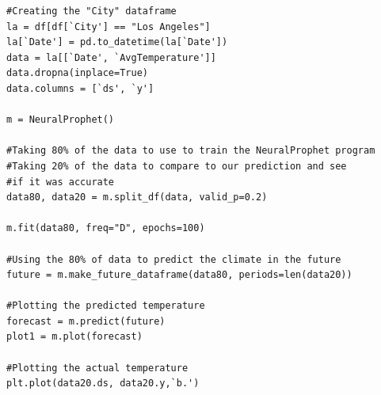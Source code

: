 \documentclass[11pt,a4paper,fleqn]{article}
\begin{document}
\begin{lstlisting}
#Creating the "City" dataframe
la = df[df[`City'] == "Los Angeles"]
la[`Date'] = pd.to_datetime(la[`Date'])
data = la[[`Date', `AvgTemperature']]
data.dropna(inplace=True)
data.columns = [`ds', `y']

m = NeuralProphet()

#Taking 80% of the data to use to train the NeuralProphet program
#Taking 20% of the data to compare to our prediction and see 
#if it was accurate 
data80, data20 = m.split_df(data, valid_p=0.2)

m.fit(data80, freq="D", epochs=100)

#Using the 80% of data to predict the climate in the future
future = m.make_future_dataframe(data80, periods=len(data20))

#Plotting the predicted temperature
forecast = m.predict(future)
plot1 = m.plot(forecast)

#Plotting the actual temperature
plt.plot(data20.ds, data20.y,`b.')

\end{lstlisting}

\footnotesize\setlength{\itemsep}{0ex}



\end{document}
